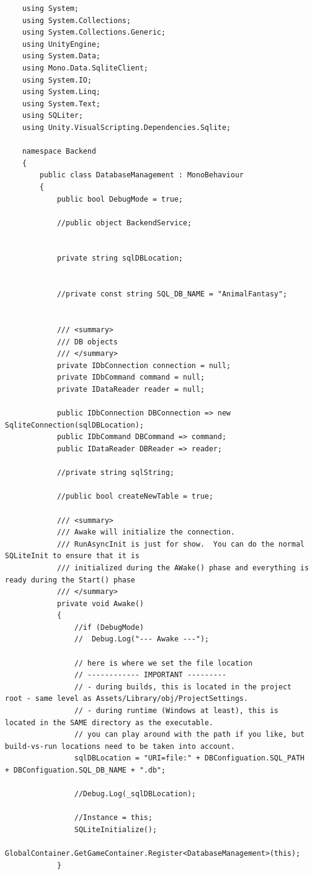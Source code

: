 \begin{verbatim}
	using System;
	using System.Collections;
	using System.Collections.Generic;
	using UnityEngine;
	using System.Data;
	using Mono.Data.SqliteClient;
	using System.IO;
	using System.Linq;
	using System.Text;
	using SQLiter;
	using Unity.VisualScripting.Dependencies.Sqlite;
	
	namespace Backend
	{
		public class DatabaseManagement : MonoBehaviour
		{
			public bool DebugMode = true;
			
			//public object BackendService;
			
			
			private string sqlDBLocation;
			
			
			//private const string SQL_DB_NAME = "AnimalFantasy";
			
			
			/// <summary>
			/// DB objects
			/// </summary>
			private IDbConnection connection = null;
			private IDbCommand command = null;
			private IDataReader reader = null;
			
			public IDbConnection DBConnection => new SqliteConnection(sqlDBLocation);
			public IDbCommand DBCommand => command;
			public IDataReader DBReader => reader;
			
			//private string sqlString;
			
			//public bool createNewTable = true;
			
			/// <summary>
			/// Awake will initialize the connection.  
			/// RunAsyncInit is just for show.  You can do the normal SQLiteInit to ensure that it is
			/// initialized during the AWake() phase and everything is ready during the Start() phase
			/// </summary>
			private void Awake()
			{
				//if (DebugMode)
				//	Debug.Log("--- Awake ---");
				
				// here is where we set the file location
				// ------------ IMPORTANT ---------
				// - during builds, this is located in the project root - same level as Assets/Library/obj/ProjectSettings.
				// - during runtime (Windows at least), this is located in the SAME directory as the executable.
				// you can play around with the path if you like, but build-vs-run locations need to be taken into account.
				sqlDBLocation = "URI=file:" + DBConfiguation.SQL_PATH + DBConfiguation.SQL_DB_NAME + ".db";
				
				//Debug.Log(_sqlDBLocation);
				
				//Instance = this;
				SQLiteInitialize();
				GlobalContainer.GetGameContainer.Register<DatabaseManagement>(this);
			}
			
			
			

\end{verbatim}
